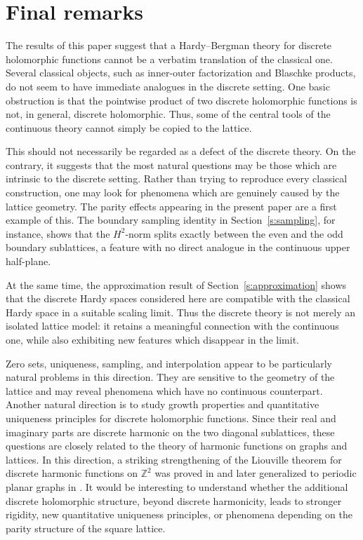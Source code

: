\documentclass[12pt,a4paper,reqno]{amsart}
\theoremstyle{definition}
\theoremstyle{definition}\newtheorem{defn}[thm]{Definition}
\begin{document}
    \section{Final remarks}\label{s:final}
    The results of this paper suggest that a Hardy--Bergman theory for discrete holomorphic functions cannot be a verbatim translation of the classical one.
    Several classical objects, such as inner-outer factorization and Blaschke
    products, do not seem to have immediate analogues in the discrete setting. One
    basic obstruction is that the pointwise product of two discrete holomorphic
    functions is not, in general, discrete holomorphic. Thus, some of the central
    tools of the continuous theory cannot simply be copied to the lattice.
    
    
    This should not necessarily be regarded as a defect of the discrete theory. On
    the contrary, it suggests that the most natural questions may be those which are
    intrinsic to the discrete setting. Rather than trying to reproduce every
    classical construction, one may look for phenomena which are genuinely caused by
    the lattice geometry. The parity effects appearing in the present paper are a
    first example of this. The boundary sampling identity in
    Section~\ref{s:sampling}, for instance, shows that the $H^2$-norm splits
    exactly between the even and the odd boundary sublattices, a feature with no
    direct analogue in the continuous upper half-plane.
    
    At the same time, the approximation result of Section~\ref{s:approximation}
    shows that the discrete Hardy spaces considered here are compatible with the
    classical Hardy space in a suitable scaling limit. Thus the discrete theory is
    not merely an isolated lattice model: it retains a meaningful connection with
    the continuous one, while also exhibiting new features which disappear in the
    limit.
    
    Zero sets, uniqueness, sampling, and interpolation appear to be particularly
    natural problems in this direction. They are sensitive to the geometry of the
    lattice and may reveal phenomena which have no continuous counterpart. Another
    natural direction is to study growth properties and quantitative uniqueness
    principles for discrete holomorphic functions. Since their real and imaginary
    parts are discrete harmonic on the two diagonal sublattices, these questions are
    closely related to the theory of harmonic functions on graphs and lattices. In
    this direction, a striking
    strengthening of the Liouville theorem for discrete harmonic functions on
    $\mathbb Z^2$ was proved in \cite{Malinnikova} and later generalized to periodic planar graphs in \cite{Bou}. It would be
    interesting to understand whether the additional discrete holomorphic structure,
    beyond discrete harmonicity, leads to stronger rigidity, new quantitative
    uniqueness principles, or phenomena depending on the parity structure of the
    square lattice.
    
\end{document}
